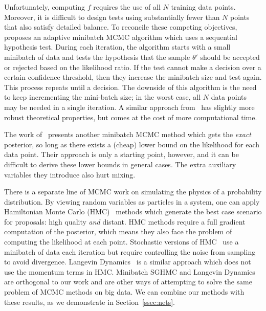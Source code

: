 \documentclass{article}
\begin{document}
Unfortunately, computing $f$ requires the use of all $N$ training data points. Moreover, it is
difficult to design tests using substantially fewer than $N$ points that also satisfy detailed
balance. To reconcile these competing objectives,~\cite{cutting_mh_2014} proposes an adaptive
minibatch MCMC algorithm which uses a sequential hypothesis test. During each iteration, the
algorithm starts with a small minibatch of data and tests the hypothesis that the sample $\theta'$
should be accepted or rejected based on the likelihood ratio. If the test cannot make a decision
over a certain confidence threshold, then they increase the minibatch size and test again. This
process repeats until a decision.  The downside of this algorithm is the need to keep incrementing
the mini-batch size; in the worst case, all $N$ data points may be needed in a single iteration.  A
similar approach from~\cite{icml2014c1_bardenet14} has slightly more robust theoretical properties,
but comes at the cost of more computational time.

The work of~\cite{conf/uai/MaclaurinA14} presents another minibatch MCMC method which gets the
\emph{exact} posterior, so long as there exists a (cheap) lower bound on the likelihood for each
data point. Their approach is only a starting point, however, and it can be difficult to derive
these lower bounds in general cases. The extra auxiliary variables they introduce also hurt mixing.

There is a separate line of MCMC work on simulating the physics of a probability distribution. By
viewing random variables as particles in a system, one can apply Hamiltonian Monte Carlo
(HMC)~\cite{mcmc_hamiltonian_2010} methods which generate the best case scenario for proposals: high
quality \emph{and} distant.  HMC methods require a full gradient computation of the posterior, which
means they also face the problem of computing the likelihood at each point. Stochastic versions of
HMC~\cite{sghmc_2014,stochastic_thermostats_2014} use a minibatch of data each iteration but require
controlling the noise from sampling to avoid divergence. Langevin
Dynamics~\cite{langevin_2011,conf/icml/AhnBW12} is a similar approach which does not use the
momentum terms in HMC.  Minibatch SGHMC and Langevin Dynamics are orthogonal to our work and are
other ways of attempting to solve the same problem of MCMC methods on big data. We can combine our
methods with these results, as we demonstrate in Section~\ref{ssec:nets}.

\end{document}
